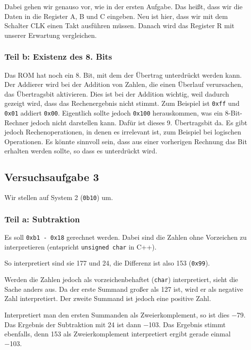 Dabei gehen wir genauso vor, wie in der ersten Aufgabe. Das heißt, dass wir die
Daten in die Register A, B und C eingeben. Neu ist hier, dass wir mit dem
Schalter CLK einen Takt ausführen müssen. Danach wird das Register R mit
unserer Erwartung vergleichen.

\subsubsection{Teil b: Existenz des 8. Bits}

Das ROM hat noch ein 8. Bit, mit dem der Übertrag unterdrückt werden kann. Der
Addierer wird bei der Addition von Zahlen, die einen Überlauf verursachen, das
Übertragsbit aktivieren. Dies ist bei der Addition wichtig, weil dadurch
gezeigt wird, dass das Rechenergebnis nicht stimmt. Zum Beispiel ist
\texttt{0xff} und \texttt{0x01} addiert \texttt{0x00}. Eigentlich sollte jedoch
\texttt{0x100} herauskommen, was ein 8-Bit-Rechner jedoch nicht darstellen
kann. Dafür ist dieses 9. Übertragsbit da. Es gibt jedoch Rechenoperationen, in
denen es irrelevant ist, zum Beispiel bei logischen Operationen. Es könnte
sinnvoll sein, dass aus einer vorherigen Rechnung das Bit erhalten werden
sollte, so dass es unterdrückt wird.

\subsection{Versuchsaufgabe 3}

Wir stellen auf System 2 (\texttt{0b10}) um.

\subsubsection{Teil a: Subtraktion}

Es soll \texttt{0xb1 - 0x18} gerechnet werden. Dabei sind die Zahlen ohne
Vorzeichen zu interpretieren (entspricht \texttt{unsigned char} in C++).

So interpretiert sind sie 177 und 24, die Differenz ist also 153
(\texttt{0x99}).

Werden die Zahlen jedoch als vorzeichenbehaftet (\texttt{char}) interpretiert,
sieht die Sache anders aus. Da der erste Summand großer als 127 ist, wird er
als negative Zahl interpretiert. Der zweite Summand ist jedoch eine positive
Zahl.

Interpretiert man den ersten Summanden als Zweierkomplement, so ist dies
\num{-79}. Das Ergebnis der Subtraktion mit 24 ist dann \num{-103}. Das
Ergebnis stimmt ebenfalls, denn 153 als Zweierkomplement
interpretiert ergibt gerade einmal \num{-103}.

